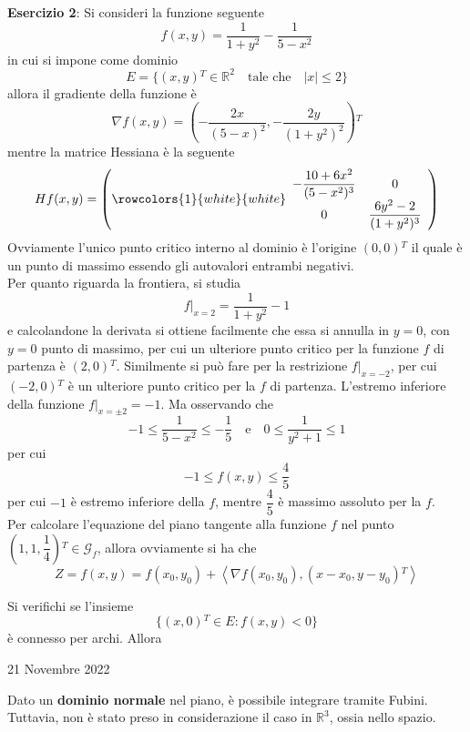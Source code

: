 \documentclass[a4paper]{extarticle}
\begin{document}
\vspace{2em}
\noindent
\textbf{Esercizio 2}: Si consideri la funzione seguente
\[f(x,y) = \dfrac{1}{1+y^2} - \dfrac{1}{5-x^2}\]
in cui si impone come dominio
\[E = \{(x,y){^T} \in \mathbb{R}^2 \hspace{1em} \text{tale che} \hspace{1em} \vert x \vert \leq 2\}\]
allora il gradiente della funzione è
\[\nabla f(x,y) = \left(- \dfrac{2x}{(5-x)^2}, - \dfrac{2y}{(1+y^2)^2}\right){^T}\]
mentre la matrice Hessiana è la seguente
\[H f(x,y) = \left(
    \rowcolors{1}{white}{white}
    \begin{array}{cc}
        -\dfrac{10+6x^2}{(5-x^2)^3} & 0\\
        0 & \dfrac{6y^2 - 2}{(1+y^2)^3}\\
    \end{array}
\right)\]
Ovviamente l'unico punto critico interno al dominio è l'origine $(0,0){^T}$ il quale è un punto di massimo essendo gli autovalori entrambi negativi.\\
Per quanto riguarda la frontiera, si studia
\[f \vert_{x=2} = \dfrac{1}{1+y^2} - 1\]
e calcolandone la derivata si ottiene facilmente che essa si annulla in $y=0$, con $y=0$ punto di massimo, per cui un ulteriore punto critico per la funzione $f$ di partenza è $(2,0){^T}$. Similmente si può fare per la restrizione $f \vert_{x=-2}$, per cui $(-2,0){^T}$ è un ulteriore punto critico per la $f$ di partenza. L'estremo inferiore della funzione $f\vert_{x=\pm 2} = -1$. Ma osservando che
\[-1 \leq \dfrac{1}{5-x^2} \leq -\dfrac{1}{5} \hspace{1em} \text{e} \hspace{1em} 0 \leq \dfrac{1}{y^2+1} \leq 1\]
per cui
\[-1 \leq f(x,y) \leq \dfrac{4}{5}\]
per cui $-1$ è estremo inferiore della $f$, mentre $\dfrac{4}{5}$ è massimo assoluto per la $f$.\\
Per calcolare l'equazione del piano tangente alla funzione $f$ nel punto $\left(1,1,\dfrac{1}{4}\right){^T} \in \mathcal{G}_f$, allora ovviamente si ha che
\[Z = f(x,y) = f(x_0,y_0) + \left<\nabla f(x_0,y_0), (x-x_0,y-y_0){^T}\right>\]

\vspace{1em}
\noindent
Si verifichi se l'insieme
\[\{(x,0){^T} \in E : f(x,y) < 0\}\]
è connesso per archi. Allora 

\newpage
\noindent
\begin{center}
    21 Novembre 2022
\end{center}
Dato un \textbf{dominio normale} nel piano, è possibile integrare tramite Fubini. Tuttavia, non è stato preso in considerazione il caso in $\mathbb{R}^3$, ossia nello spazio.
\end{document}
